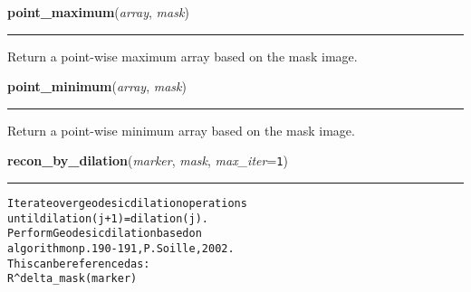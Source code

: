    \label{multireg:morph:point_maximum}
    \vspace{0.5ex}

    \begin{boxedminipage}{\textwidth}

    \raggedright \textbf{point\_maximum}(\textit{array}, \textit{mask})

    \vspace{-1.5ex}

    \rule{\textwidth}{0.5\fboxrule}
    Return a point-wise maximum array based on the mask image.

    \vspace{1ex}

    \end{boxedminipage}

    \label{multireg:morph:point_minimum}
    \vspace{0.5ex}

    \begin{boxedminipage}{\textwidth}

    \raggedright \textbf{point\_minimum}(\textit{array}, \textit{mask})

    \vspace{-1.5ex}

    \rule{\textwidth}{0.5\fboxrule}
    Return a point-wise minimum array based on the mask image.

    \vspace{1ex}

    \end{boxedminipage}

    \label{multireg:morph:recon_by_dilation}
    \vspace{0.5ex}

    \begin{boxedminipage}{\textwidth}

    \raggedright \textbf{recon\_by\_dilation}(\textit{marker}, \textit{mask}, \textit{max\_iter}=\texttt{1\-})

    \vspace{-1.5ex}

    \rule{\textwidth}{0.5\fboxrule}
\begin{alltt}
Iterate over geodesic dilation operations
until dilation(j+1) = dilation(j).
Perform Geodesic dilation based on
algorithm on p. 190-191, P. Soille, 2002. 
This can be referenced as:
  R{\textasciicircum}delta\_mask(marker)\end{alltt}

    \vspace{1ex}

    \end{boxedminipage}

